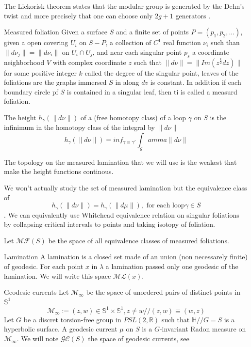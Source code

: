 \begin{rmq}
The Lickorisk theorem states that the modular group is generated by the Dehn's twist and more precisely that one can choose only $2g+1$ generators \cite{Lickorish1964AFS}.
\end{rmq}

\begin{dfnt}{Measured foliation}
Given a surface $S$ and a finite set of points $P=(p_1,p_2,...)$, given a open covering $U_i$ on $S-P$, a collection of $C^1$
 real function $\nu_i$ such than $\| d \nu_j \| = \| d \nu_i \|$  on $U_i \cap U_j$,
 and near each singular point $p_s$ a coordinate neighborhood $V$ with complex coordinate $z$ such that $\| d \nu \| = \| Im(z^{\frac{k}{2}}dz) \|$ for some positive integer $k$ called the degree of the singular point,
 leaves of the foliations are the graphs immersed $S$ in along $dv$ is constant. In addition if each boundary circle pf $S$ is contained in a singular leaf, then ti is called a measurd foliation.
\end{dfnt}

The height $h_\gamma(\| d \nu \|)$ of a (free homotopy class) of a loop $\gamma$ on $S$ is the infinimum in the homotopy class of the integral by $\| d \nu \|$
\[
h_\gamma(\| d \nu \|)=inf_{\gamma \equiv \gamma'} \int_gamma \| d \nu \|
\]

The topology on the measured lamination that we will use is the weakest that make the height functions continous.

\begin{rmq}
We won't actually study the set of measured lamination but the equivalence class of \[
h_\gamma(\| d \nu \|)=h_\gamma(\| d \mu \|), \text{ for each loop} \gamma \in S
\].
We can equivalently use Whitehead equivalence relation on singular foliations by collapsing critical intervals to points and taking isotopy of foliation.
\end{rmq}

Let $\mathcal{MF}(S)$ be the space of all equivalence classes of measured foliations.

\begin{dfnt}{Lamination}
A lamination is a closed set made of an union (non necessarely finite) of geodesic.
For each point $x$ in $\lambda$ a lamination passed only one geodesic of the lamination.
We will write this space $\mathcal{ML}(x)$.
\end{dfnt}

\begin{dfnt}{Geodesic currents}
Let $\mathcal{M}_\infty$ be the space of unordered pairs of distinct points in $\mathbb{S}^1$ \[
\mathcal{M}_\infty := {(z,w) \in \mathbb{S}^1 \times \mathbb{S}^1 , z \neq w}//(z,w) \equiv (w,z)
\]
Let $G$ be a discret torsion-free group in $PSL(2,\mathbb{R})$ such that $\mathbb{H}//G=S$ is a hyperbolic surface.
A geodesic current $\mu$ on $S$ is a $G$-invariant Radon measure on $\mathcal{M}_\infty$.
We will note $\mathcal{GC}(S)$ the space of geodesic currents, see \cite{kapovich2009hyperbolic}
\end{dfnt}

